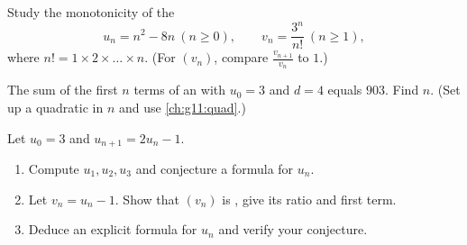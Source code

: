 \begin{exercise}[$\star\star$]\label{exo:g11:seq:9}
Study the monotonicity of the 
\[
u_n = n^2 - 8n \ (n \geq 0), \qquad
v_n = \frac{3^n}{n!}\ (n \geq 1),
\]
where $n! = 1 \times 2 \times \dots \times n$. (For $(v_n)$, compare
$\frac{v_{n+1}}{v_n}$ to $1$.)
\end{exercise}

\begin{exercise}[$\star\star$]\label{exo:g11:seq:10}
The sum of the first $n$ terms of an  with $u_0 = 3$
and $d = 4$ equals $903$. Find $n$. (Set up a quadratic  in $n$
and use \cref{ch:g11:quad}.)
\end{exercise}

\begin{exercise}[$\star\star\star$]\label{exo:g11:seq:11}
Let $u_0 = 3$ and $u_{n+1} = 2u_n - 1$.
\begin{enumerate}
  \item Compute $u_1, u_2, u_3$ and conjecture a formula for $u_n$.
  \item Let $v_n = u_n - 1$. Show that $(v_n)$ is , give its
        ratio and first term.
  \item Deduce an explicit formula for $u_n$ and verify your conjecture.
\end{enumerate}
\end{exercise}
